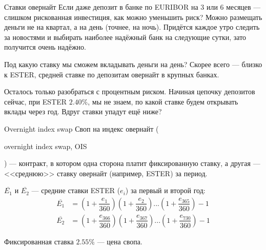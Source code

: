 \documentclass{beamer}
\renewcommand{\EUR}[1]{\textup{\euro}#1}
\newcommand{\en}[1]{\begin{otherlanguage}{english}#1\end{otherlanguage}}
\begin{document}
\begin{frame}{Ставки овернайт}
\justify
Если даже депозит в банке по EURIBOR на 3 или 6 месяцев --- слишком рискованная инвестиция, как можно уменьшить риск? Можно размещать деньги не на квартал, а на день (точнее, на ночь). Придётся каждое утро следить за новостями и выбирать наиболее надёжный банк на следующие сутки, зато получится очень надёжно.

\justify
Под какую ставку мы сможем вкладывать деньги на день? Скорее всего --- близко к ESTER, средней ставке по депозитам овернайт в крупных банках.

\justify
Осталось только разобраться с процентным риском. Начиная цепочку депозитов сейчас, при ESTER $2.40\%$, мы не знаем, по какой ставке будем открывать вклады через год. Вдруг ставки упадут ещё ниже?
\end{frame}



\begin{frame}{Overnight index swap}
\justify
Своп на индекс овернайт (\en{overnight index swap, OIS}) --- контракт, в котором одна сторона платит фиксированную ставку, а другая --- <<среднюю>> ставку овернайт (например, ESTER) за период.

\justify
\centering
{}

\justify
$\overline{E_1}$ и $\overline{E_2}$ --- средние ставки ESTER ($e_i$) за первый и второй год:
\begin{align*}
\overline{E_1} &= \left(1 + \dfrac{e_1}{360}\right)
\left(1 + \dfrac{e_2}{360}\right)
...
\left(1 + \dfrac{e_{365}}{360}\right) - 1 \\
\overline{E_2} &= \left(1 + \dfrac{e_{366}}{360}\right)
\left(1 + \dfrac{e_{367}}{360}\right)...
\left(1 + \dfrac{e_{730}}{360}\right) - 1
\end{align*}

\justify
Фиксированная ставка $2.55\%$ --- цена свопа.
\end{frame}
\end{document}
